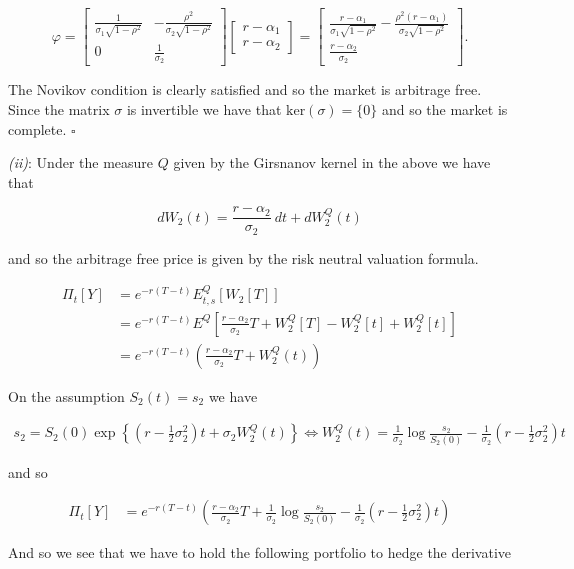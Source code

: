 \documentclass[
]{book}
\begin{document}
\[
\varphi=
\begin{bmatrix}
\frac{1}{\sigma_1\sqrt{1-\rho^2}} & -\frac{\rho^2}{\sigma_2\sqrt{1-\rho^2}}\\
0 & \frac{1}{\sigma_2}
\end{bmatrix}
\begin{bmatrix}
r-\alpha_1\\
r-\alpha_2
\end{bmatrix}=
\begin{bmatrix}
\frac{r-\alpha_1}{\sigma_1\sqrt{1-\rho^2}} -\frac{\rho^2(r-\alpha_1)}{\sigma_2\sqrt{1-\rho^2}}\\
\frac{r-\alpha_2}{\sigma_2}
\end{bmatrix}.
\]

The Novikov condition is clearly satisfied and so the market is arbitrage free. Since the matrix \(\sigma\) is invertible we have that \(\text{ker}(\sigma)=\{0\}\) and so the market is complete. \(\square\)

\emph{(ii)}: Under the measure \(Q\) given by the Girsnanov kernel in the above we have that

\[
dW_2(t)=\frac{r-\alpha_2}{\sigma_2}\ dt+dW^Q_2(t)
\]

and so the arbitrage free price is given by the risk neutral valuation formula.

\begin{align*}
\Pi_t[Y]&=e^{-r(T-t)}E^Q_{t,s}\left[W_2[T]\right]\\
&=e^{-r(T-t)}E^Q\left[\frac{r-\alpha_2}{\sigma_2} T+W_2^Q[T]-W_2^Q[t]+W_2^Q[t]\right]\\
&=e^{-r(T-t)}\left(\frac{r-\alpha_2}{\sigma_2} T+W_2^Q(t)\right)
\end{align*}

On the assumption \(S_2(t)=s_2\) we have

\begin{align*}
s_2=S_2(0)\exp\left\{\left(r-\frac{1}{2}\sigma_2^2\right)t+\sigma_2 W_2^Q(t)\right\}\iff W_2^Q(t)=\frac{1}{\sigma_2}\log\frac{s_2}{S_2(0)}-\frac{1}{\sigma_2}\left(r-\frac{1}{2}\sigma_2^2\right)t
\end{align*}

and so

\begin{align*}
\Pi_t[Y]&=e^{-r(T-t)}\left(\frac{r-\alpha_2}{\sigma_2} T+\frac{1}{\sigma_2}\log\frac{s_2}{S_2(0)}-\frac{1}{\sigma_2}\left(r-\frac{1}{2}\sigma_2^2\right)t\right)
\end{align*}

And so we see that we have to hold the following portfolio to hedge the derivative
\end{document}

